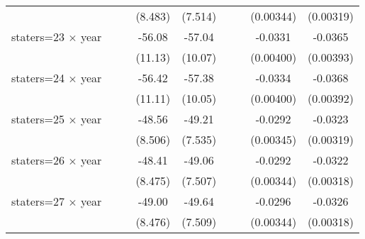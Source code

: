 {\begin{longtable}{l*{8}{c}}
                    &                     &                     &     (8.483)         &     (7.514)         &                     &                     &   (0.00344)         &   (0.00319)         \\
[1em]
staters=23 $\times$ year&                     &                     &      -56.08\sym{***}&      -57.04\sym{***}&                     &                     &     -0.0331\sym{***}&     -0.0365\sym{***}\\
                    &                     &                     &     (11.13)         &     (10.07)         &                     &                     &   (0.00400)         &   (0.00393)         \\
[1em]
staters=24 $\times$ year&                     &                     &      -56.42\sym{***}&      -57.38\sym{***}&                     &                     &     -0.0334\sym{***}&     -0.0368\sym{***}\\
                    &                     &                     &     (11.11)         &     (10.05)         &                     &                     &   (0.00400)         &   (0.00392)         \\
[1em]
staters=25 $\times$ year&                     &                     &      -48.56\sym{***}&      -49.21\sym{***}&                     &                     &     -0.0292\sym{***}&     -0.0323\sym{***}\\
                    &                     &                     &     (8.506)         &     (7.535)         &                     &                     &   (0.00345)         &   (0.00319)         \\
[1em]
staters=26 $\times$ year&                     &                     &      -48.41\sym{***}&      -49.06\sym{***}&                     &                     &     -0.0292\sym{***}&     -0.0322\sym{***}\\
                    &                     &                     &     (8.475)         &     (7.507)         &                     &                     &   (0.00344)         &   (0.00318)         \\
[1em]
staters=27 $\times$ year&                     &                     &      -49.00\sym{***}&      -49.64\sym{***}&                     &                     &     -0.0296\sym{***}&     -0.0326\sym{***}\\
                    &                     &                     &     (8.476)         &     (7.509)         &                     &                     &   (0.00344)         &   (0.00318)         \\

\end{longtable}}
